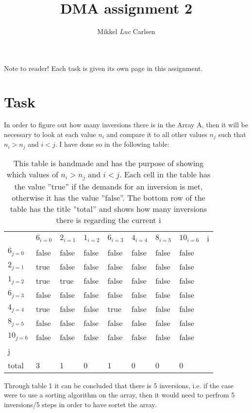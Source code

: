 \documentclass[a4paper]{article}
\title{DMA assignment 2}
\author{Mikkel \emph{Luc} Carlsen}
\begin{document}
    \maketitle 

    \begin{flushleft}
        \footnotesize{Note to reader! Each task is given its own page in this assignment.} 
    \end{flushleft}

    \section*{Task }
    In order to figure out how many inversions there is in the Array A, then it will be necessary to look at each value $n_i$ and 
    compare it to all other values $n_j$ such that $n_i>n_j$ and $i<j$. I have done so in the following table: 

    \begin{table}[H]
        \begin{tabular}{lllllllll}
              & $6_{i=0}$     & $2_{i=1}$     & $1_{i=2}$     & $6_{i=3}$     & $4_{i=4}$     & $8_{i=5}$     & $10_{i=6}$    & i   \\
        $6_{j=0}$     & false & false & false & false & false & false & false & \\
        $2_{j=1}$     & true  & false & false & false & false & false & false & \\
        $1_{j=2}$     & true  & true  & false & false & false & false & false & \\
        $6_{j=3}$     & false & false & false & false & false & false & false & \\
        $4_{j=4}$     & true  & false & false & true  & false & false & false & \\
        $8_{j=5}$     & false & false & false & false & false & false & false & \\
        $10_{j=6}$    & false & false & false & false & false & false & false & \\
        j     &       &       &       &       &       &       &       & \\
        total & 3     & 1     & 0     & 1     & 0     & 0     & 0     & 
        \end{tabular}
        \caption{This table is handmade and has the purpose of showing which values of $n_i>n_j$ and $i<j$. Each cell in the table has
        the value ''true'' if the demands for an inversion is met, otherwise it has the value ''false''. The bottom row of the table has the
        title ''total'' and shows how many inversions there is regarding the current i}
        \end{table}
    \begin{flushleft}
        Through table 1 it can be concluded that there is 5 inversions, i.e. if the case were to use a sorting algorithm on the array, then it would need to perfrom 5 inversions/5 steps in order to have sortet the array.
    \end{flushleft}  
\end{document}
